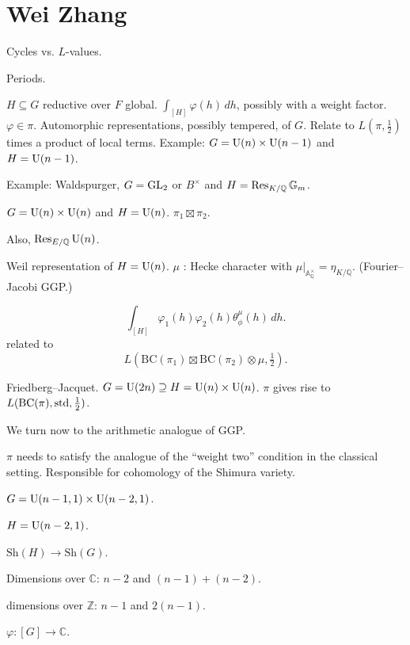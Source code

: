 \documentclass[reqno]{amsart} 
\begin{document}
\section{Wei Zhang}

Cycles vs. $L$-values.

Periods.

$H \subseteq G$ reductive over $F$ global.  $\int_{[H]} \varphi(h) \, d h$, possibly with a weight factor.  $\varphi \in \pi$.  Automorphic representations, possibly tempered, of $G$.  Relate to $L(\pi, \tfrac{1}{2})$ times a product of local terms.  Example: $G = \operatorname{U}(n) \times \operatorname{U}(n-1)$ and $H = \operatorname{U}(n-1)$.

Example: Waldspurger, $G = \operatorname{GL}_2$ or $B^\times $ and $H = \operatorname{Res}_{K / \mathbb{Q}}\mathbb{G}_m$.

$G = \operatorname{U}(n) \times \operatorname{U}(n)$ and $H = \operatorname{U}(n)$.  $\pi_1 \boxtimes \pi_2$.

Also, $\operatorname{Res}_{E / \mathbb{Q}} \operatorname{U}(n)$.

Weil representation of $H =\operatorname{U}(n)$.  $\mu$ : Hecke character with $\mu |_{\mathbb{A}_{\mathbb{Q}}^\times } = \eta_{K/\mathbb{Q}}$.  (Fourier--Jacobi GGP.)

\begin{equation*}
\int_{[H]} \varphi_1(h) \varphi_2(h) \theta_\phi^\mu(h) \, d h.
\end{equation*}
related to
\begin{equation*}
L\left(\mathrm{BC}(\pi_1) \boxtimes \mathrm{BC}(\pi_2) \otimes \mu, \tfrac{1}{2}\right).
\end{equation*}

Friedberg--Jacquet.  $G = \operatorname{U}(2 n) \supseteq H = \operatorname{U}(n) \times \operatorname{U}(n)$.  $\pi$ gives rise to $L(\mathrm{BC}(\pi), \operatorname{std}, \tfrac{1}{2})$.

We turn now to the arithmetic analogue of GGP.

$\pi$ needs to satisfy the analogue of the ``weight two'' condition in the classical setting.  Responsible for cohomology of the Shimura variety.

$G = \operatorname{U}(n - 1, 1) \times \operatorname{U}(n - 2, 1)$.

$H = \operatorname{U}(n-2,1)$.

$\mathrm{Sh}(H) \rightarrow \mathrm{Sh}(G)$.

Dimensions over $\mathbb{C}$: $n - 2$ and $(n - 1) +(n - 2)$.

dimensions over $\mathbb{Z}$: $n - 1$ and $2(n - 1)$.

$\varphi : [G] \rightarrow \mathbb{C}$.
\end{document}
